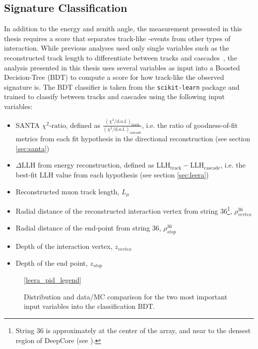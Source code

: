 \subsection{Signature Classification}
\label{sec:pid}
In addition to the energy and zenith angle, the measurement presented in this thesis requires a score that separates track-like \numucc-events from other types of interaction. While previous analyses used only single variables such as the reconstructed track length to differentiate between tracks and cascades~\cite{deepcore_sterile_2017, Aartsen_2015,IceCube:2019dqi}, the analysis presented in this thesis uses several variables as input into a Boosted Decision-Tree (BDT) to compute a score for how track-like the observed signature is. The BDT classifier is taken from the \texttt{scikit-learn}\cite{scikit-learn} package and trained to classify between tracks and cascades using the following input variables:
\begin{itemize}
    \item SANTA $\chi^2\textrm{-ratio}$, defined as  $\frac{(\chi^{2}/\mathrm{d.o.f.})_{\mathrm{track}}}{(\chi^{2}/\mathrm{d.o.f.})_{\mathrm{cascade}}}$, i.e. the ratio of goodness-of-fit metrics from each fit hypothesis in the directional reconstruction (see section \ref{sec:santa})
    \item $\Delta$LLH from energy reconstruction, defined as LLH$_\mathrm{track}-$LLH$_\mathrm{cascade}$, i.e. the best-fit LLH value from each hypothesis (see section \ref{sec:leera})
    \item Reconstructed muon track length, $L_{\mu}$
    \item Radial distance of the reconstructed interaction vertex from string 36\footnote{String 36 is approximately at the center of the array, and near to the densest region of DeepCore (see ).}, $\rho^{36}_{vertex}$
    \item Radial distance of the end-point from string 36, $\rho^{36}_{stop}$
    \item Depth of the interaction vertex, $z_{vertex}$
    \item Depth of the end point, $z_{stop}$    
\end{itemize}
\begin{figure}
    \centering
    \ref{leera_pid_legend}

    
    
    
    \caption{Distribution and data/MC comparison for the two most important input variables into the classification BDT.}
    \label{fig:bdt-input-vars}
\end{figure}
